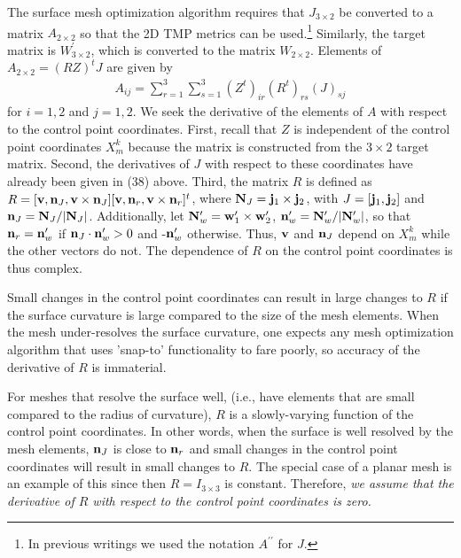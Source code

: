 \documentclass{report}
\begin{document}
 \newline
The surface mesh optimization algorithm requires that $J_{3 \times 2}$ be 
converted to a matrix $A_{2 \times 2}$ so that the 2D TMP metrics can be 
used.\footnote{In previous writings we used the notation $A^{\prime\prime}$ for $J$.} Similarly, the target matrix is $W^\prime_{3 \times 2}$, which is converted to the matrix $W_{2 \times 2}$. Elements of $A_{2 \times 2}=(RZ)^t J$ 
are given by
\begin{eqnarray}
A_{ij} = \sum_{r=1}^3 \sum_{s=1}^3 \left( Z^t \right)_{ir} \left( R^t \right)_{rs} \left( J \right)_{sj}
\end{eqnarray}
for $i=1,2$ and $j=1,2$. We seek the derivative of the elements of $A$ with
respect to the control point coordinates. 
First, recall that $Z$ is independent of the control
point coordinates $X_m^k$ because the matrix is constructed from the 
$3 \times 2$ target matrix.  Second, the derivatives of $J$ with respect to
these coordinates have already been given in (38) above.  Third, the matrix $R$ is 
defined as $R = [{\bf v},{\bf n}_J,{\bf v} \times {\bf n}_J][{\bf v},{\bf n}_r,{\bf v} \times {\bf n}_r]^t$, where ${\bf N}_J = {\bf j}_1 \times {\bf j}_2$, 
with $J= [{\bf j}_1,{\bf j}_2]$ and ${\bf n}_J={\bf N}_J/|{\bf N}_J|$.
Additionally, let ${\bf N}_w^\prime = {\bf w}_1^\prime \times {\bf w}_2^\prime$, ${\bf n}_w^\prime = {\bf N}_w^\prime/|{\bf N}_w^\prime|$, so that 
${\bf n}_r = {\bf n}_w^\prime$ if ${\bf n}_J \cdot {\bf n}_w^\prime>0$ and 
-${\bf n}_w^\prime$ otherwise. Thus, ${\bf v}$ and ${\bf n}_J$ depend on 
$X_m^k$ while the other vectors do not. The dependence of $R$ on the control
point coordinates is thus complex. \newline

\noindent Small changes in the control point coordinates can result in large 
changes to $R$ if the surface curvature is large compared to the size
of the mesh elements. When the mesh under-resolves the surface curvature, 
one expects any mesh optimization algorithm that uses 'snap-to' 
functionality to fare poorly, so accuracy of the derivative of $R$ is  
immaterial.  \newline
 
\noindent For meshes that resolve the 
surface well, (i.e., have elements that are small compared to the radius of 
curvature), $R$ is a slowly-varying function of the 
control point coordinates.  In other words, when the surface is well resolved 
by the mesh elements, ${\bf n}_J$ is close to ${\bf n}_r$ and small
changes in the control point coordinates will result in small changes to $R$. 
The special case of a planar mesh is an example of this since then 
$R=I_{3 \times 3}$ is constant. Therefore, {\it we assume that the derivative 
of $R$ with respect to the control point coordinates is zero.} \newline
\end{document}
